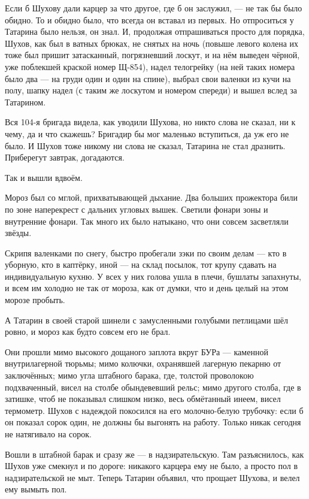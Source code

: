 Если б Шухову дали карцер за что другое, где б он заслужил, --- не так бы было обидно. То и 
обидно было, что всегда он вставал из первых. Но отпроситься у Татарина было нельзя, он знал. 
И, продолжая отпрашиваться просто для порядка, Шухов, как был в ватных брюках, не снятых на 
ночь (повыше левого колена их тоже был пришит затасканный, погрязневший лоскут, и на нём 
выведен чёрной, уже поблекшей краской номер Щ-854), надел телогрейку (на ней таких номера было 
два --- на груди один и один на спине), выбрал свои валенки из кучи на полу, шапку надел (с таким 
же лоскутом и номером спереди) и вышел вслед за Татарином.

Вся 104-я бригада видела, как уводили Шухова, но никто слова не сказал, ни к чему, да и что 
скажешь? Бригадир бы мог маленько вступиться, да уж его не было. И Шухов тоже никому ни слова 
не сказал, Татарина не стал дразнить. Приберегут завтрак, догадаются.

Так и вышли вдвоём.

Мороз был со мглой, прихватывающей дыхание. Два больших прожектора били по зоне наперекрест 
с дальних угловых вышек. Светили фонари зоны и внутренние фонари. Так много их было натыкано, 
что они совсем засветляли звёзды.

Скрипя валенками по снегу, быстро пробегали зэки по своим делам --- кто в уборную, кто в 
каптёрку, иной --- на склад посылок, тот крупу сдавать на индивидуальную кухню. У всех у них 
голова ушла в плечи, бушлаты запахнуты, и всем им холодно не так от мороза, как от думки, что и 
день целый на этом морозе пробыть.

А Татарин в своей старой шинели с замусленными голубыми петлицами шёл ровно, и мороз как 
будто совсем его не брал.

Они прошли мимо высокого дощаного заплота вкруг БУРа --- каменной внутрилагерной тюрьмы; 
мимо колючки, охранявшей лагерную пекарню от заключённых; мимо угла штабного барака, где, 
толстой проволокою подхваченный, висел на столбе обындевевший рельс; мимо другого столба, 
где в затишке, чтоб не показывал слишком низко, весь обмётанный инеем, висел термометр. Шухов 
с надеждой покосился на его молочно-белую трубочку: если б он показал сорок один, не должны 
бы выгонять на работу. Только никак сегодня не натягивало на сорок.

Вошли в штабной барак и сразу же --- в надзирательскую. Там разъяснилось, как Шухов уже 
смекнул и по дороге: никакого карцера ему не было, а просто пол в надзирательской не мыт. 
Теперь Татарин объявил, что прощает Шухова, и велел ему вымыть пол.

